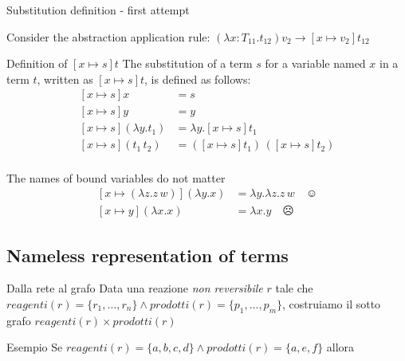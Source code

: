 \documentclass[8pt]{beamer}
\begin{document}
\begin{frame}{Substitution definition - first attempt}

    Consider the abstraction application rule:
        $(\lambda x:T_{11}.t_{12})v_{2} \rightarrow [x \mapsto v_{2}]t_{12}$

    \pause

    \begin{block}{Definition of $[x \mapsto s]t$}
        The substitution of a term $s$ for a variable named $x$ in a term $t$,
        written as $[x \mapsto s]t$, is defined as follows:
        \begin{displaymath}
            \begin{split}
                [x \mapsto s]x &= s \\
                [x \mapsto s]y &= y \\
                [x \mapsto s](\lambda y.t_{1}) &= \lambda y. [x \mapsto s]t_{1} \\
                [x \mapsto s](t_{1} \, t_{2}) &= 
                    ([x \mapsto s]t_{1})\, ([x \mapsto s]t_{2})\\
            \end{split}
        \end{displaymath}        
    \end{block}

    \pause

    \begin{alertblock}{The names of bound variables do not matter}
        \begin{displaymath}
            \begin{split}
                [x \mapsto (\lambda z. z\, w)](\lambda y.x) &=
                     \lambda y.\lambda z.z\, w \quad \smiley \\
                [x \mapsto y](\lambda x.x) &= \lambda x.y \quad \frownie
            \end{split}
        \end{displaymath}
    \end{alertblock}
\end{frame}

\subsection{Nameless representation of terms}

\begin{frame}{Dalla rete al grafo}
  Data una reazione \emph{non reversibile} $r$ tale che $reagenti(r) =
  \{ r_{1}, \ldots, r_{n} \} \wedge prodotti(r) = \{ p_{1}, \ldots,
  p_{m} \}$, costruiamo il sotto grafo $reagenti(r) \times
  prodotti(r)$
    \begin{block}{Esempio}
      Se $reagenti(r) = \{ a, b, c, d \} \wedge prodotti(r) = \{a, e,
      f\}$ allora
    \end{block}
\end{frame}
\end{document}
